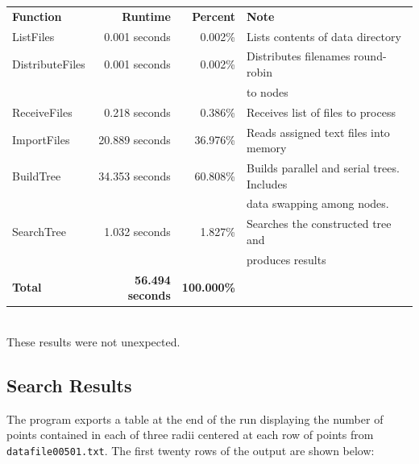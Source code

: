\begin{tabular}{l r r l}
\textbf{Function}         & \textbf{Runtime}        & \textbf{Percent} & \textbf{Note} \\
ListFiles        &  0.001 seconds & 0.002\% & Lists contents of data directory \\
DistributeFiles  &  0.001 seconds & 0.002\% & Distributes filenames round-robin \\
& & & to nodes \\
ReceiveFiles     &  0.218 seconds & 0.386\% & Receives list of files to process \\
ImportFiles      & 20.889 seconds & 36.976\% & Reads assigned text files into memory \\
BuildTree        & 34.353 seconds & 60.808\% & Builds parallel and serial trees. Includes \\
& & & data swapping among nodes.\\
SearchTree       &  1.032 seconds & 1.827\% & Searches the constructed tree and \\
& & &  produces results \\
\textbf{Total}   & \textbf{56.494 seconds} & \textbf{100.000\%} & \\
\end{tabular} \\

These results were not unexpected.


%
%

\subsection{Search Results}

The program exports a table at the end of the run displaying the number of points contained in each of three radii centered at each row of points from  \texttt{datafile00501.txt}. The first twenty rows of the output are shown below: \\

